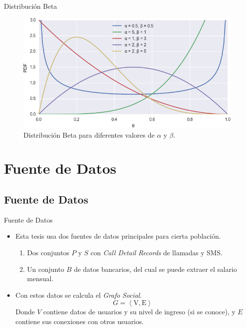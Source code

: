 \documentclass{beamer}
\begin{document}
\begin{frame}{Distribución Beta}
	
	\begin{figure}
		\includegraphics[width=\framewidth]{beta.png}
		\caption{Distribución Beta para diferentes valores de $\alpha$ y $\beta$.}
	\end{figure}
	
\end{frame}

\section{Fuente de Datos}

\subsection{Fuente de Datos}

\begin{frame}{Fuente de Datos}
	\begin{itemize}
		\item Esta tesis usa dos fuentes de datos principales para cierta población.
			\begin{enumerate}
				\item Dos conjuntos $P$ y $S$ con \emph{Call Detail Records} de llamadas y SMS\@.
				\item Un conjunto $B$ de datos bancarios, del cual se puede extraer el salario mensual.
			\end{enumerate}
		\item Con estos datos se calcula el \emph{Grafo Social}.
			\begin{equation*}
				G = \left< \text{V}, \text{E} \right>
			\end{equation*}
			Donde $V$ contiene datos de usuarios y su nivel de ingreso (si se conoce), y $E$ contiene sus conexiones con otros usuarios.
	\end{itemize}
\end{frame}
\end{document}
